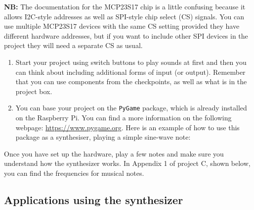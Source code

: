
\vspace*{-0.5cm}

{\bf NB:} The documentation for the MCP23S17 chip is a little confusing because it allows I2C-style addresses as well as SPI-style chip select (CS) signals.
You can use multiple MCP23S17 devices with the same CS setting provided they have different hardware addresses, but if you want to include other SPI devices in the project they will need a separate CS as usual.
 
\begin{enumerate}
\item Start your project using switch buttons to play sounds at first and then you can think about including additional forms of input (or output).
Remember that you can use components from the checkpoints, as well as what is in the project box.

\item You can base your project on the \texttt{PyGame} package, which is already installed on the Raspberry Pi.
You can find a more information on the following webpage: \url{https://www.pygame.org}.
Here is an example of how to use this package as a synthesiser, playing a simple sine-wave note:

\end{enumerate}

Once you have set up the hardware, play a few notes and make sure you understand how the synthesizer works. In Appendix 1 of project C, shown below, you can find the frequencies for musical notes.


\subsection{Applications using the synthesizer}

